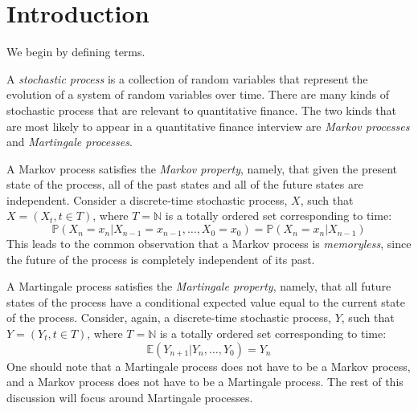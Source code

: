 \section{Introduction}
\label{sec:intro}

We begin by defining terms.

A {\it stochastic process} is a collection of random variables 
that represent the evolution of a system of random variables
over time.  There are many kinds of stochastic process that are
relevant to quantitative finance.  The two kinds that are 
most likely to appear in a quantitative finance interview are
{\it Markov processes} and {\it Martingale processes}.

A Markov process satisfies the {\it Markov property}, namely, that
given the present state of the process, all of the past states
and all of the future states are independent.  Consider a discrete-time
stochastic process, $X$, such that $X = (X_{t}, t \in T)$, where $T = \mathbb{N}$ is a 
totally ordered set corresponding to time:
\begin{equation}
  \mathbb{P}(X_n = x_n | X_{n-1} = x_{n-1}, \ldots, X_0 = x_0) = \mathbb{P}(X_n = x_n | X_{n-1})
\end{equation}
This leads to the common observation that a Markov process is {\it memoryless}, 
since the future of the process is completely independent of its past.

A Martingale process satisfies the {\it Martingale property}, namely, that
all future states of the process have a conditional
expected value equal to the current state of the process.
Consider, again, a discrete-time stochastic process, $Y$, 
such that $Y = (Y_{t}, t \in T)$, where $T = \mathbb{N}$ is a 
totally ordered set corresponding to time:
\begin{equation}
  \mathbb{E}(Y_{n+1}|Y_n, \ldots ,Y_0) = Y_n
\end{equation}
One should note that a Martingale process does not have to be a Markov
process, and a Markov process does not have to be a Martingale process.
The rest of this discussion will focus around  Martingale processes.

